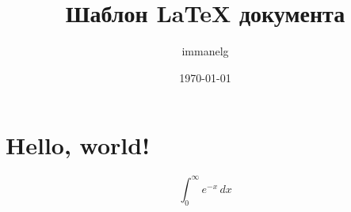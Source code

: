 \documentclass[a4paper,11pt]{extarticle}
\begin{document}
\title{Шаблон LaTeX документа}
\author{immanelg}
\date{\today}

\section*{Hello, world!}
\lipsum
\[ \int_{0}^{\infty} e^{-x} \, dx \]
\lipsum
\end{document}
